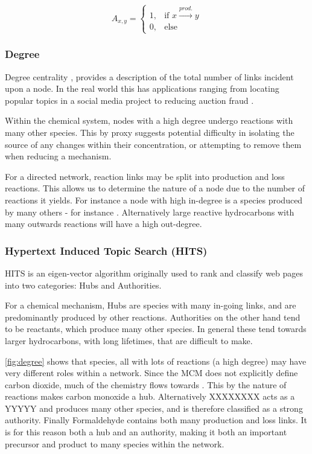 \documentclass[twoside,reqno]{article}
\newcommand{\ch}[1]{\MakeUppercase{\ce{#1}}}  %
\begin{document}
\begin{equation}
    A_{ x,y}=
    \begin{cases}
      1, & \text{if           $x\xrightarrow{prod.}y$}\\
      0, & \text{else}
    \end{cases}\label{binary}
\end{equation}

\subsubsection{Degree}
Degree centrality \cite{degreefreeman}, provides a description of the total number of links incident upon a node. In the real world this has applications ranging from locating popular topics in a social media project to reducing auction fraud \cite{degreetwitter,degreefreeman}.


Within the chemical system, nodes with a high degree undergo reactions with many other species. This by proxy suggests potential difficulty in isolating the source of any changes within their concentration, or attempting to remove them when reducing a mechanism.

For a directed network, reaction links may be split into production and loss reactions. This allows us to determine the nature of a node due to the number of reactions it yields. For instance a node with high in-degree is a species produced by many others - for instance \ch{co}. Alternatively large reactive hydrocarbons with many outwards reactions will have a high out-degree.

\subsubsection{Hypertext Induced Topic Search (HITS)}
HITS \cite{hits,hitsvspagerank} is an eigen-vector algorithm originally used to rank and classify web pages \cite{hitsweb}into two categories: Hubs and Authorities.

For a chemical mechanism, Hubs are species with many in-going links, and are predominantly produced by other reactions. Authorities on the other hand tend to be reactants, which produce many other species. In general these tend towards larger hydrocarbons, with long lifetimes, that are difficult to make.

\autoref{fig:degree} shows that species, all with lots of reactions (a high degree) may have very different roles within a network. Since the MCM does not explicitly define carbon dioxide, much of the chemistry flows towards \ch{CO}. This by the nature of reactions makes carbon monoxide a hub. Alternatively XXXXXXXX acts as a YYYYY and produces many other species, and is therefore classified as a strong authority. Finally Formaldehyde contains both many production and loss links. It is for this reason both a hub and an authority, making it both an important precursor and product to many species within the network.
\end{document}
